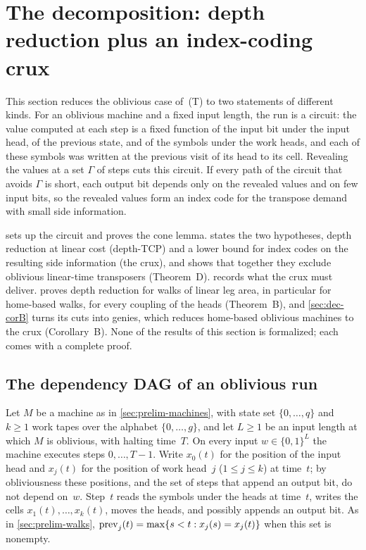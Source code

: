 \section{The decomposition: depth reduction plus an index-coding crux}\label{sec:decomposition}

This section reduces the oblivious case of~(T) to two statements of different kinds. For an oblivious machine and a
fixed input length, the run is a circuit: the value computed at each step is a fixed function of the input bit under
the input head, of the previous state, and of the symbols under the work heads, and each of these symbols was written
at the previous visit of its head to its cell. Revealing the values at a set $\Gamma$ of steps cuts this circuit. If
every path of the circuit that avoids $\Gamma$ is short, each output bit depends only on the revealed values and on
few input bits, so the revealed values form an index code for the transpose demand with small side information.

 sets up the circuit and proves the cone lemma.  states the two hypotheses, depth
reduction at linear cost (depth-TCP) and a lower bound for index codes on the resulting side information (the crux),
and shows that together they exclude oblivious linear-time transposers (Theorem~D).  records what
the crux must deliver.  proves depth reduction for walks of linear leg area, in particular for
home-based walks, for every coupling of the heads (Theorem~B), and \cref{sec:dec-corB} turns its cuts into genies,
which reduces home-based oblivious machines to the crux (Corollary~B). None of the results of this section is formalized; each comes with a complete proof.

\subsection{The dependency DAG of an oblivious run}\label{sec:dec-dag}

Let $M$ be a machine as in \cref{sec:prelim-machines}, with state set $\{0,\dots,q\}$ and $k\ge1$ work tapes over the
alphabet $\{0,\dots,g\}$, and let $L\ge1$ be an input length at which $M$ is oblivious, with halting time~$T$. On
every input $w\in\{0,1\}^L$ the machine executes steps $0,\dots,T-1$. Write $x_0(t)$ for the position of the input
head and $x_j(t)$ for the position of work head~$j$ ($1\le j\le k$) at time~$t$; by obliviousness these positions,
and the set of steps that append an output bit, do not depend on~$w$. Step~$t$ reads the symbols under the heads at
time~$t$, writes the cells $x_1(t),\dots,x_k(t)$, moves the heads, and possibly appends an output bit. As in
\cref{sec:prelim-walks}, $\mathrm{prev}_j(t)=\max\{s<t:x_j(s)=x_j(t)\}$ when this set is nonempty.

